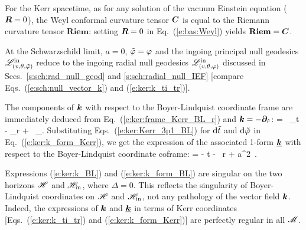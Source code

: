 \begin{remark}
For the Kerr spacetime, as for any solution of the vacuum Einstein equation ($\bm{R}=0$),
the Weyl conformal curvature tensor $\bm{C}$ is equal to the Riemann curvature tensor $\textbf{Riem}$:
setting $\bm{R}=0$ in Eq.~(\ref{e:bas:Weyl}) yields $\textbf{Riem} = \bm{C}$.
\end{remark}

\begin{remark}
At the Schwarzschild limit, $a=0$, ${\tilde\varphi} = \varphi$ and the ingoing principal null geodesics
$\mathscr{L}^{\rm in}_{(v,\theta,{\tilde\varphi})}$ reduce to the ingoing radial null geodesics
$\mathscr{L}^{\rm in}_{(v,\theta,\varphi)}$ discussed in Secs.~\ref{s:sch:rad_null_geod} and \ref{s:sch:radial_null_IEF} [compare Eqs.~(\ref{e:sch:null_vector_k}) and (\ref{e:ker:k_ti_tr})].
\end{remark}


The components of $\bm{k}$ with respect to the Boyer-Lindquist coordinate frame
are immediately deduced from Eq.~(\ref{e:ker:frame_Kerr_BL_r})
and $\bm{k} = - \bm{\partial}_{\hat{r}}$:
\be \label{e:ker:k_BL}
     =  \, \wpar_t
        - \wpar_r +  \, \wpar_\ph .
\ee
Substituting Eqs.~(\ref{e:ker:Kerr_3p1_BL}) for $\mathrm{d}{\tilde t}$ and $\mathrm{d}{\tilde\varphi}$ in
Eq.~(\ref{e:ker:k_form_Kerr}), we get the expression of the associated 1-form
$\underline{\bm{k}}$ with respect to the Boyer-Lindquist coordinate coframe:
\be \label{e:ker:k_form_BL}
     = - \dd t - \, \dd r + a\sin^2\th \, \dd \ph .
\ee
\begin{remark}
Expressions (\ref{e:ker:k_BL}) and (\ref{e:ker:k_form_BL}) are singular
on the two horizons $\mathscr{H}$ and $\mathscr{H}_{\rm in}$, where $\Delta = 0$.
This reflects the
singularity of Boyer-Lindquist coordinates on $\mathscr{H}$ and $\mathscr{H}_{\rm in}$, not any
pathology of the vector field $\bm{k}$. Indeed, the expressions of $\bm{k}$ and
$\underline{\bm{k}}$ in terms of Kerr coordinates [Eqs.~(\ref{e:ker:k_ti_tr})
and (\ref{e:ker:k_form_Kerr})] are perfectly regular in all $\mathscr{M}$.
\end{remark}



